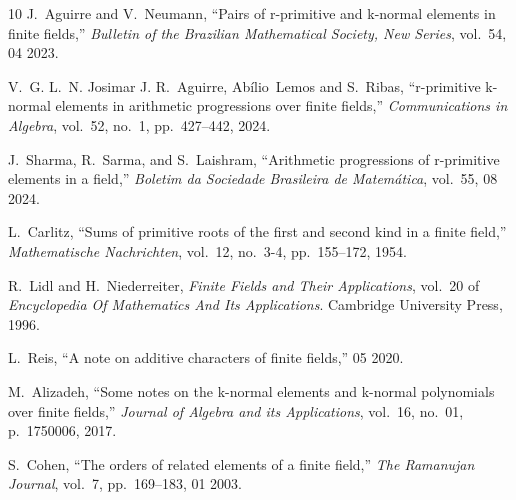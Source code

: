 \documentclass[12pt,a4paper]{article}
\theoremstyle{plain}
\theoremstyle{definition}
\numberwithin{equation}{section}
\begin{document}
\begin{thebibliography}{10}
    	J.~Aguirre and V.~Neumann, ``Pairs of r-primitive and k-normal elements in
    	finite fields,'' {\em Bulletin of the Brazilian Mathematical Society, New
    		Series}, vol.~54, 04 2023.
    	
    	V.~G. L.~N. Josimar J. R.~Aguirre, Abílio~Lemos and S.~Ribas, ``r-primitive
    	k-normal elements in arithmetic progressions over finite fields,'' {\em
    		Communications in Algebra}, vol.~52, no.~1, pp.~427--442, 2024.
    	
    	J.~Sharma, R.~Sarma, and S.~Laishram, ``Arithmetic progressions of r-primitive
    	elements in a field,'' {\em Boletim da Sociedade Brasileira de Matemática},
    	vol.~55, 08 2024.
    	
    	L.~Carlitz, ``Sums of primitive roots of the first and second kind in a finite
    	field,'' {\em Mathematische Nachrichten}, vol.~12, no.~3-4, pp.~155--172,
    	1954.
    	
    	R.~Lidl and H.~Niederreiter, {\em Finite Fields and Their Applications},
    	vol.~20 of {\em Encyclopedia Of Mathematics And Its Applications}.
    	\newblock Cambridge University Press, 1996.
    	
    	L.~Reis, ``A note on additive characters of finite fields,'' 05 2020.
    	
    	M.~Alizadeh, ``Some notes on the k-normal elements and k-normal polynomials
    	over finite fields,'' {\em Journal of Algebra and its Applications}, vol.~16,
    	no.~01, p.~1750006, 2017.
    	
    	S.~Cohen, ``The orders of related elements of a finite field,'' {\em The
    		Ramanujan Journal}, vol.~7, pp.~169--183, 01 2003.
    	
    \end{thebibliography}
    
\end{document}
